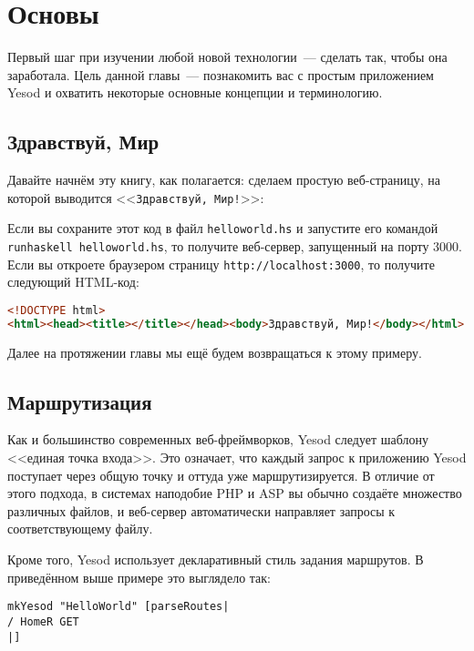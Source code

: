 \chapter{Основы}\label{chap:basics}

Первый шаг при изучении любой новой технологии~--- сделать так, чтобы она заработала. Цель
данной главы~--- познакомить вас с простым приложением Yesod и охватить некоторые основные
концепции и терминологию.

\section{Здравствуй, Мир}

Давайте начнём эту книгу, как полагается: сделаем простую веб-страницу, на которой
выводится <<\texttt{Здравствуй, Мир!}>>:


Если вы сохраните этот код в файл \lstinline!helloworld.hs! и запустите его командой
\lstinline!runhaskell helloworld.hs!, то получите веб-сервер, запущенный на порту 3000.
Если вы откроете браузером страницу \lstinline'http://localhost:3000', то получите
следующий HTML-код:

\begin{lstlisting}[language=HTML]
<!DOCTYPE html>
<html><head><title></title></head><body>Здравствуй, Мир!</body></html>
\end{lstlisting}

Далее на протяжении главы мы ещё будем возвращаться к этому примеру.

\section{Маршрутизация}

Как и большинство современных веб-фреймворков, Yesod следует шаблону <<единая точка
входа>>. Это означает, что каждый запрос к приложению Yesod поступает через общую точку и
оттуда уже маршрутизируется. В отличие от этого подхода, в системах наподобие PHP и ASP вы
обычно создаёте множество различных файлов, и веб-сервер автоматически направляет запросы
к соответствующему файлу.

Кроме того, Yesod использует декларативный стиль задания маршрутов. В приведённом выше
примере это выглядело так:

\begin{lstlisting}
mkYesod "HelloWorld" [parseRoutes|
/ HomeR GET
|]
\end{lstlisting}


